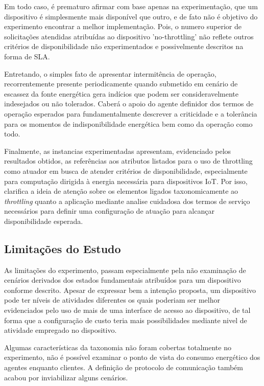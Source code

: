 Em todo caso, é prematuro afirmar com base apenas na experimentação, que um dispositivo é simplesmente mais disponível que outro, e de fato não é objetivo do experimento encontrar a melhor implementação. Pois, o numero superior de solicitações atendidas atribuídas ao dispositivo 'no-throttling' não reflete outros critérios de disponibilidade não experimentados e possivelmente descritos na forma de \acs{SLA}.

Entretando, o simples fato de apresentar intermitência de operação, recorrentemente presente periodicamente quando submetido em cenário de escassez da fonte energética gera indícios que podem ser consideravelmente indesejados ou não tolerados. Caberá o apoio do agente definidor dos termos de operação esperados para fundamentalmente descrever a criticidade e a tolerância para os momentos de indisponibilidade energética bem como da operação como todo. 

Finalmente, as instancias experimentadas apresentam, evidenciado pelos resultados obtidos, as referências aos atributos listados para o uso de throttling como atuador em busca de atender critérios de disponibilidade, especialmente para computação dirigida à energia necessária para dispositivos \acs{IoT}. Por isso,  clarifica a ideia de atenção sobre os elementos ligados taxonomicamente ao \textit{throttling} quanto a aplicação mediante analise cuidadosa dos termos de serviço necessários para definir uma configuração de atuação para alcançar disponibilidade esperada.



\subsection{Limitações do Estudo}

As limitações do experimento, passam especialmente pela não examinação de cenários derivados dos estados fundamentais atribuídos para um dispositivo conforme descrito. Apesar de expressar bem a intenção proposta, um dispositivo pode ter níveis de atividades diferentes os quais poderiam ser melhor evidenciados pelo uso de mais de uma interface de acesso ao dispositivo, de tal forma que a configuração de custo teria mais possibilidades mediante nivel de atividade empregado no dispositivo.

Algumas características da taxonomia não foram cobertas totalmente no experimento, não é possível examinar o ponto de vista do consumo energético dos agentes enquanto clientes. A definição de protocolo de comunicação também acabou por inviabilizar alguns cenários.





 